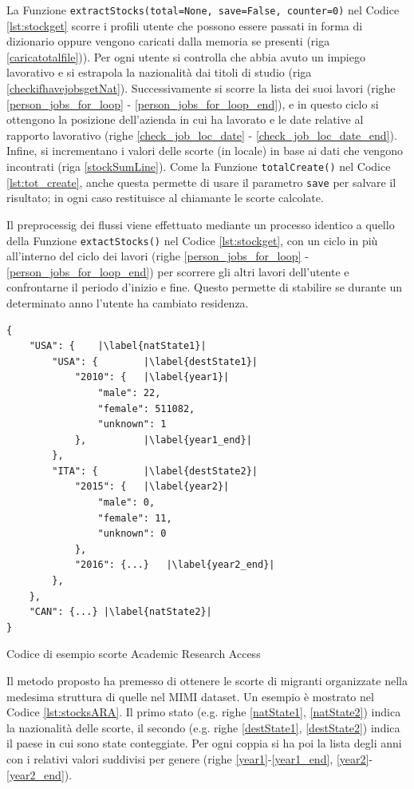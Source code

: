 La Funzione \texttt{extractStocks(total=None, save=False, counter=0)} nel Codice \ref{lst:stockget} scorre i profili utente che possono essere passati in forma di dizionario oppure vengono caricati dalla memoria se presenti (riga \ref{caricatotalfile})). 
Per ogni utente si controlla che abbia avuto un impiego lavorativo e si estrapola la nazionalità dai titoli di studio (riga \ref{checkifhavejobsgetNat}). Successivamente si scorre la lista dei suoi lavori (righe \ref{person_jobs_for_loop} - \ref{person_jobs_for_loop_end}), e in questo ciclo si ottengono la posizione dell'azienda in cui ha lavorato e le date relative al rapporto lavorativo (righe \ref{check_job_loc_date} - \ref{check_job_loc_date_end}). Infine, si incrementano i valori delle scorte (in locale) in base ai dati che vengono incontrati (riga \ref{stockSumLine}). Come la Funzione \texttt{totalCreate()} nel Codice \ref{lst:tot_create}, anche questa permette di usare il parametro \texttt{save} per salvare il risultato; in ogni caso restituisce al chiamante le scorte calcolate.

Il preprocessig dei flussi viene effettuato mediante un processo identico a quello della Funzione \texttt{extactStocks()} nel Codice \ref{lst:stockget}, con un ciclo in più all'interno del ciclo dei lavori (righe \ref{person_jobs_for_loop} - \ref{person_jobs_for_loop_end}) per scorrere gli altri lavori dell'utente e confrontarne il periodo d'inizio e fine. Questo permette di stabilire se durante un determinato anno l'utente ha cambiato residenza.

\begin{listing}[htbp]
\begin{verbatim}
{
    "USA": {    |\label{natState1}|
        "USA": {        |\label{destState1}|
            "2010": {   |\label{year1}|
                "male": 22,
                "female": 511082,
                "unknown": 1
            },          |\label{year1_end}|
        },
        "ITA": {        |\label{destState2}|
            "2015": {   |\label{year2}|
                "male": 0,
                "female": 11,
                "unknown": 0
            },
            "2016": {...}   |\label{year2_end}|
        },
    },
    "CAN": {...} |\label{natState2}|
}
\end{verbatim}
\caption{Codice di esempio scorte Academic Research Access}
\label{lst:stocksARA}
\end{listing}

Il metodo proposto ha premesso di ottenere le scorte di migranti organizzate nella medesima struttura di quelle nel MIMI dataset. Un esempio è mostrato nel Codice \ref{lst:stocksARA}. Il primo stato (e.g. righe \ref{natState1}, \ref{natState2}) indica la nazionalità delle scorte, il secondo (e.g. righe \ref{destState1}, \ref{destState2}) indica il paese in cui sono state conteggiate. Per ogni coppia si ha poi la lista degli anni con i relativi valori suddivisi per genere (righe \ref{year1}-\ref{year1_end}, \ref{year2}-\ref{year2_end}). 



